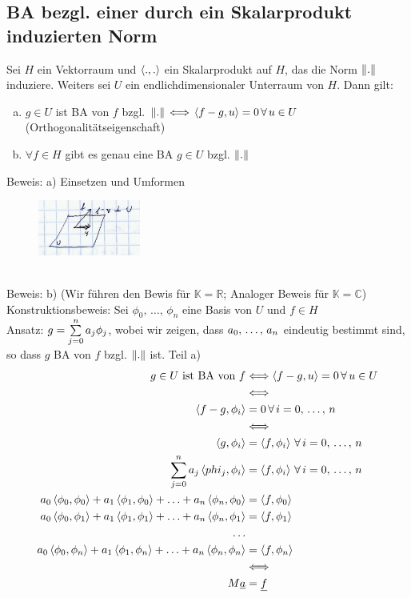 \subsection{BA bezgl. einer durch ein Skalarprodukt induzierten Norm}
 Sei $H$ ein Vektorraum und $\left\langle ., . \right\rangle$ ein Skalarprodukt auf $H$, das die
Norm $\left\lVert . \right\rVert$ induziere. Weiters sei $U$ ein endlichdimensionaler Unterraum von $H$.
Dann gilt:
\begin{enumerate}[a)]
  \item $g \in U$ ist BA von $f$ bzgl. 
    $\left\lVert . \right\rVert\,\Longleftrightarrow\,\left\langle f - g, u \right\rangle = 0\,\forall\,u \in U$
    (Orthogonalitätseigenschaft)
  \item $\forall f \in H$ gibt es genau eine BA $g \in U$ bzgl. $\left\lVert . \right\rVert$
\end{enumerate}
Beweis: a) Einsetzen und Umformen
\begin{figure}[htbp]
  \centering
  \includegraphics[width=0.3\textwidth]{figures/ba_ebene.png}
  \label{Darstellung auf Ebene}
\end{figure}\\
Beweis: b) (Wir führen den Bewis für $\mathbb{K} = \mathbb{R}$;
Analoger Beweis für $\mathbb{K} = \mathbb{C}$)\\
Konstruktionsbeweis: Sei ${\phi_0,\,\ldots,\,\phi_n}$ eine Basis von $U$ und $f \in H$\\
Ansatz: $g = \sum\limits_{j=0}^{n}{a_j \phi_j}$, wobei wir zeigen, dass $a_0,\,\ldots,\,a_n$
eindeutig bestimmt sind, so dass $g$ BA von $f$ bzgl. $\left\lVert . \right\rVert$ ist.
Teil a)
\begin{align*}
  g \in U \text{ ist BA von } f &\Longleftrightarrow \left\langle f - g, u \right\rangle = 0\, \forall\, u \in U\\
  &\Longleftrightarrow\\
  \left\langle f-g, \phi_i \right\rangle &= 0\, \forall\, i=0,\,\ldots,\,n\\
  &\Longleftrightarrow\\
  \left\langle g, \phi_i \right\rangle &= \left\langle f, \phi_i \right\rangle\, \forall\, i=0,\,\ldots,\,n\\
  \sum\limits_{j=0}^{n}{a_j\left\langle phi_j, \phi_i \right\rangle} &= \left\langle f, \phi_i \right\rangle\, \forall\, i=0,\,\ldots,\,n\\
  a_0\left\langle \phi_0, \phi_0 \right\rangle + a_1\left\langle \phi_1, \phi_0 \right\rangle + \ldots + a_n\left\langle \phi_n, \phi_0 \right\rangle &= \left\langle f, \phi_0 \right\rangle\\
    a_0\left\langle \phi_0, \phi_1 \right\rangle + a_1\left\langle \phi_1, \phi_1 \right\rangle + \ldots + a_n\left\langle \phi_n, \phi_1 \right\rangle &= \left\langle f, \phi_1 \right\rangle\\
  \ldots\\
  a_0\left\langle \phi_0, \phi_n \right\rangle + a_1\left\langle \phi_1, \phi_n \right\rangle + \ldots + a_n\left\langle \phi_n, \phi_n \right\rangle &= \left\langle f, \phi_n \right\rangle\\
  &\Longleftrightarrow\\
  M\underline{a} &= \underline{f}
\end{align*}
